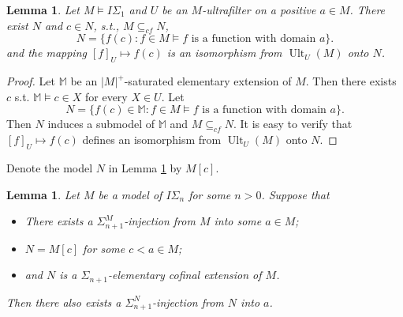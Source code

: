 \documentclass[twoside,a4paper]{amsart}
\newtheorem{lemma}[theorem]{Lemma}
\theoremstyle{definition}
\theoremstyle{theorem}
\numberwithin{equation}{section}
\newcommand{\<}{\langle}
\renewcommand{\>}{\rangle}
\newcommand{\Ult}{\operatorname{Ult}}
\begin{document}
\begin{lemma}\label{lem:Ult-reprstn}
Let $M \models I\Sigma_1$ and $U$ be an $M$-ultrafilter on a positive $a \in M$.
There exist $N$ and $c \in N$, s.t., $M \subseteq_{cf} N$,
 \[
  N = \{f(c): f \in M \models f \text{ is a function with domain } a\}.
 \]
 and the mapping $[f]_U \mapsto f(c)$ is an isomorphism from $\Ult_U(M)$ onto $N$.
\end{lemma}

\begin{proof}
Let $\mathbb{M}$ be an $|M|^+$-saturated elementary extension of $M$.
Then there exists $c$ s.t. $\mathbb{M} \models c \in X$ for every $X \in U$.
Let
\[
  N = \{f(c) \in \mathbb{M}: f \in M \models f \text{ is a function with domain } a\}.
\]
Then $N$ induces a submodel of $\mathbb{M}$ and $M \subseteq_{cf} N$.
It is easy to verify that $[f]_U \mapsto f(c)$ defines an isomorphism from $\Ult_U(M)$ onto $N$.
\end{proof}

Denote the model $N$ in Lemma \ref{lem:Ult-reprstn} by $M[c]$.

\begin{lemma}\label{lem:M[c]-CSigma}
Let $M$ be a model of $I\Sigma_n$ for some $n > 0$.
Suppose that
\begin{itemize}
 \item There exists a $\Sigma_{n+1}^M$-injection from $M$ into some $a \in M$;
 \item $N = M[c]$ for some $c < a \in M$;
 \item and $N$ is a $\Sigma_{n+1}$-elementary cofinal extension of $M$.
\end{itemize}
Then there also exists a $\Sigma_{n+1}^N$-injection from $N$ into $a$.
\end{lemma}
\end{document}
